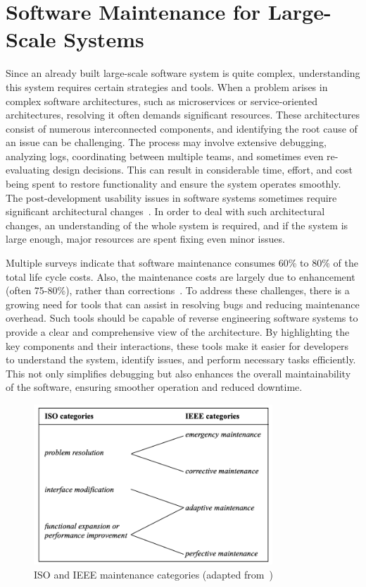 \section{Software Maintenance for Large-Scale Systems}

Since an already built large-scale software system is quite complex, understanding this system requires certain strategies and tools. When a problem arises in complex software architectures, such as microservices or service-oriented architectures, resolving it often demands significant resources. These architectures consist of numerous interconnected components, and identifying the root cause of an issue can be challenging. The process may involve extensive debugging, analyzing logs, coordinating between multiple teams, and sometimes even re-evaluating design decisions. This can result in considerable time, effort, and cost being spent to restore functionality and ensure the system operates smoothly. The post-development usability issues in software systems sometimes require significant architectural changes~\citep{Folmer2005}. In order to deal with such architectural changes, an understanding of the whole system is required, and if the system is large enough, major resources are spent fixing even minor issues.

 Multiple surveys indicate that software maintenance consumes 60\% to 80\% of the total life cycle costs. Also, the maintenance costs are largely due to enhancement (often 75{-}80\%), rather than corrections~\citep{SeMaintainance2001}. To address these challenges, there is a growing need for tools that can assist in resolving bugs and reducing maintenance overhead. Such tools should be capable of reverse engineering software systems to provide a clear and comprehensive view of the architecture. By highlighting the key components and their interactions, these tools make it easier for developers to understand the system, identify issues, and perform necessary tasks efficiently. This not only simplifies debugging but also enhances the overall maintainability of the software, ensuring smoother operation and reduced downtime.

\begin{figure}[H]
    \centering
    \includegraphics[width=0.8\textwidth]{figures/maintenance_process.png}
    \caption[ISO and IEEE maintenance categories]{ISO and IEEE maintenance categories (adapted from~\cite{SeMaintainance2001})}
	\label{fig_se_maintenance}
\end{figure}